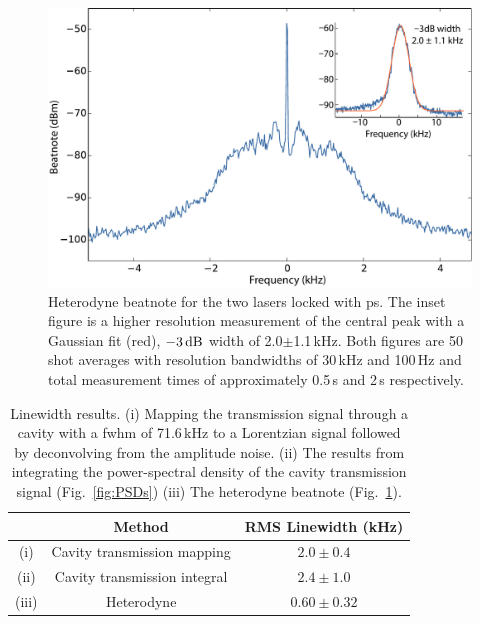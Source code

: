 \begin{figure}[htbp]
\centering
\includegraphics[width=\linewidth]{chapter1/Figs/fig5_v1.pdf}
\caption{Heterodyne beatnote for the two lasers locked with \gls*{ps}. The inset figure is a higher resolution measurement of the central peak with a Gaussian fit (red), $-3\rm\,dB$ width of 2.0$\pm$1.1\,kHz. Both figures are 50 shot averages with resolution bandwidths of 30\,kHz and 100\,Hz and total measurement times of approximately 0.5\,s and 2\,s respectively.}
\label{beatnote}
\end{figure}

\begin{table}[htbp]
\centering
\begin{tabular}{c c c}
\hline
  & Method & RMS Linewidth (kHz) \\ \hline
  (i) & Cavity transmission mapping  & $2.0 \pm 0.4$ \\
  (ii) &Cavity transmission integral & $2.4 \pm 1.0$ \\
  (iii) & Heterodyne & $0.60\pm0.32$ \\ \hline\end{tabular}
\caption{Linewidth results. (i) Mapping the transmission signal through a cavity with a \gls*{fwhm} of 71.6\,kHz to a Lorentzian signal followed by deconvolving from the amplitude noise. (ii) The results from integrating the power-spectral density of the cavity transmission signal (Fig.~\ref{fig:PSDs}) (iii) The heterodyne beatnote (Fig.~\ref{beatnote}).}
\label{linewidth_table}
\end{table}

